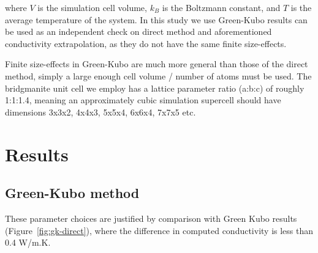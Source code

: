 \documentclass[%
preprint,                                  %
nofootinbib,
 amsmath,amssymb,
 aps,
]{revtex4-1}
\begin{document}

where $V$ is the simulation cell volume, $k_B$ is the Boltzmann constant, and $T$ is the average temperature of the system. In this study we use Green-Kubo results can be used as an independent check on direct method and aforementioned conductivity extrapolation, as they do not have the same finite size-effects.

Finite size-effects in Green-Kubo are much more general than those of the direct method, simply a large enough cell volume / number of atoms must be used. The bridgmanite unit cell we employ has a lattice parameter ratio (a:b:c) of roughly 1:1:1.4, meaning an approximately cubic simulation supercell should have dimensions 3x3x2, 4x4x3, 5x5x4, 6x6x4, 7x7x5 etc.



















\section{\label{sec:results}Results}

\subsection{\label{sec:results.gk}Green-Kubo method}

These parameter choices are justified by comparison with Green Kubo results (Figure~\ref{fig:gk-direct}), where the difference in computed conductivity is less than 0.4 W/m.K.
\end{document}
